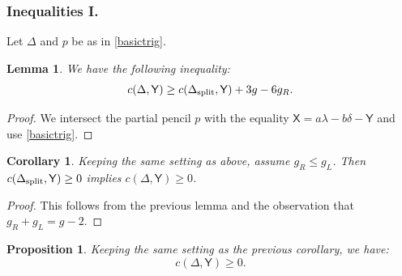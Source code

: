 \documentclass[reqno, 10 pt]{article}
\newtheorem{lem}[thm]{Lemma}
\newtheorem{prop}[thm]{Proposition}
\newtheorem{cor}[thm]{Corollary}
\theoremstyle{definition}
\theoremstyle{remark}
\numberwithin{equation}{section}
\numberwithin{thm}{section}
\numberwithin{prop}{section}
\numberwithin{lem}{section}
\numberwithin{cor}{section}
\numberwithin{conj}{section}
\numberwithin{defn}{section}
\newcommand{\sfY}{{\mathsf Y}}
\newcommand{\sfX}{{\mathsf X}}
\newcommand {\spl}{{\rm split}}
\begin{document}
\subsubsection{Inequalities I.} Let $\Delta$ and $p$ be as in \autoref{basictrig}.  

\begin{lem}
We have the following inequality:
\begin{equation}\label{4.1}
c(\Delta, {\sfY}) \geq c(\Delta_{\spl}, {\sfY}) + 3g-6g_R.
\end{equation}
\end{lem} 

\begin{proof}
We intersect the partial pencil $p$ with the equality $\sfX = a\lambda - b\delta - {\sfY}$ and use \autoref{basictrig}. 
\end{proof}

\begin{cor}\label{induct1}
Keeping the same setting as above, assume $g_R \leq g_L$. Then $c(\Delta_{\spl}, {\sfY}) \geq 0$ implies $c(\Delta, {\sfY}) \geq 0 $.  
\end{cor}

\begin{proof}
This follows from the previous lemma and the observation that $g_{R}+g_{L} = g-2$.
\end{proof}

\begin{prop}\label{unramified1}
Keeping the same setting as the previous corollary, we have: 
$$c(\Delta, \sfY) \geq 0.$$
\end{prop}
\end{document}
